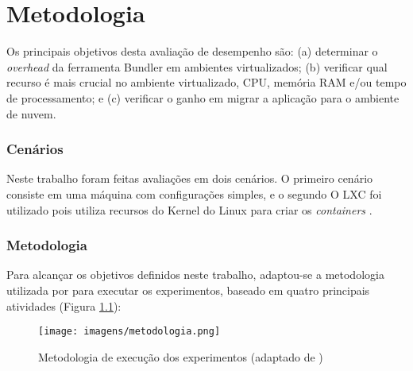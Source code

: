 


\chapter[Metodologia]{Metodologia}
\label{sec:experimental-design}

\setcounter{footnote}{23}


Os principais objetivos desta avaliação de desempenho são: (a) determinar o \textit{overhead} da ferramenta Bundler em ambientes virtualizados; (b) verificar qual recurso é mais crucial no ambiente virtualizado, CPU, memória RAM e/ou tempo de processamento; e (c) verificar o ganho em migrar a aplicação para o ambiente de nuvem.

\subsection{Cenários}
\label{subsec:cenarios}

Neste trabalho foram feitas avaliações em dois cenários. O primeiro cenário consiste em uma máquina com configurações simples, e o segundo  O LXC foi utilizado pois utiliza recursos do Kernel do Linux para criar os \textit{containers} \cite{dua2014virtualization}.

\subsection{Metodologia}
\label{subsec:metodologia}

Para alcançar os objetivos definidos neste trabalho, adaptou-se a metodologia utilizada por \cite{sousa2012evaluating} para executar os experimentos, baseado em quatro principais atividades (Figura \ref{fig:methodology}):


\begin{figure}[h!]
\centering
\texttt{[image: imagens/metodologia.png]}
\caption{Metodologia de execução dos experimentos (adaptado de \cite{sousa2012evaluating})}
\label{fig:methodology}
\end{figure}

